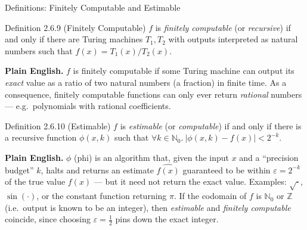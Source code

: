 \documentclass[aspectratio=169,10pt]{beamer}
\newcommand{\N}{\mathbb{N}}
\newcommand{\Z}{\mathbb{Z}}
\begin{document}
\begin{frame}{Definitions: Finitely Computable and Estimable}
  \begin{block}{Definition 2.6.9 (Finitely Computable)}
    $f$ is \emph{finitely computable} (or \emph{recursive}) if and only if
    there are Turing machines $T_1, T_2$ with outputs interpreted as natural
    numbers such that $f(x) = T_1(x)/T_2(x)$.
  \end{block}
  \textbf{Plain English.} $f$ is finitely computable if some Turing machine
  can output its \emph{exact} value as a ratio of two natural numbers (a
  fraction) in finite time. As a consequence, finitely computable functions
  can only ever return \emph{rational} numbers --- e.g.\ polynomials with
  rational coefficients.

  \begin{block}{Definition 2.6.10 (Estimable)}
    $f$ is \emph{estimable} (or \emph{computable}) if and only if there is a
    recursive function $\phi(x,k)$ such that
    $\forall k \in \N_0.\ |\phi(x,k) - f(x)| < 2^{-k}$.
  \end{block}
  \textbf{Plain English.} $\phi$ (phi) is an algorithm that, given the input
  $x$ and a ``precision budget'' $k$, halts and returns an estimate
  $\widehat{f(x)}$ guaranteed to be within $\varepsilon = 2^{-k}$ of the true
  value $f(x)$ --- but it need not return the exact value. Examples: $\sqrt{\cdot}$,
  $\sin(\cdot)$, or the constant function returning $\pi$. If the codomain of
  $f$ is $\N_0$ or $\Z$ (i.e.\ output is known to be an integer), then
  \emph{estimable} and \emph{finitely computable} coincide, since choosing
  $\varepsilon = \tfrac12$ pins down the exact integer.
\end{frame}
\end{document}
